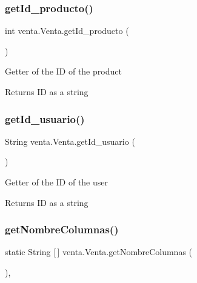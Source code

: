 \subsubsection{\texorpdfstring{get\+Id\+\_\+producto()}{getId\_producto()}}
{\footnotesize\ttfamily int venta.\+Venta.\+get\+Id\+\_\+producto (\begin{DoxyParamCaption}{ }\end{DoxyParamCaption})\hspace{0.3cm}{\ttfamily [inline]}}

Getter of the ID of the product

\begin{DoxyReturn}{Returns}
ID as a string 
\end{DoxyReturn}
\mbox{\label{classventa_1_1_venta_a4ff2b190dba80f9bf653e24e0b820e54}} 
\subsubsection{\texorpdfstring{get\+Id\+\_\+usuario()}{getId\_usuario()}}
{\footnotesize\ttfamily String venta.\+Venta.\+get\+Id\+\_\+usuario (\begin{DoxyParamCaption}{ }\end{DoxyParamCaption})\hspace{0.3cm}{\ttfamily [inline]}}

Getter of the ID of the user

\begin{DoxyReturn}{Returns}
ID as a string 
\end{DoxyReturn}
\mbox{\label{classventa_1_1_venta_a517a4e2b36e633e0adab951596a733ed}} 
\subsubsection{\texorpdfstring{get\+Nombre\+Columnas()}{getNombreColumnas()}}
{\footnotesize\ttfamily static String \mbox{[}$\,$\mbox{]} venta.\+Venta.\+get\+Nombre\+Columnas (\begin{DoxyParamCaption}{ }\end{DoxyParamCaption})\hspace{0.3cm}{\ttfamily [inline]}, {\ttfamily [static]}}

